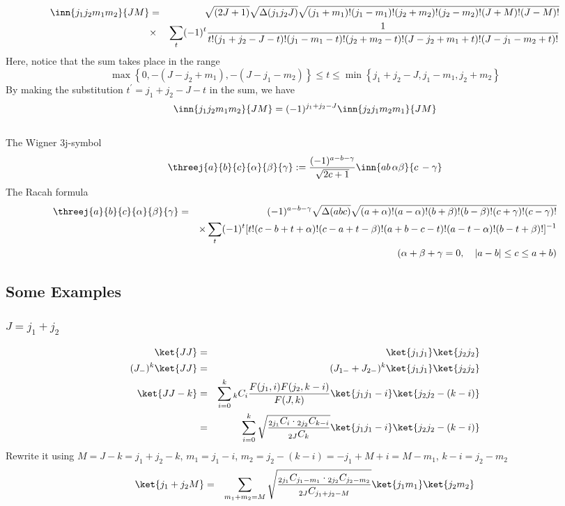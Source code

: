 \documentclass{article}
\begin{document}
{\begin{eqnarray}
\inn{j_1j_2m_1m_2}{JM} & = & \sqrt{(2J+1)}\sqrt{\Delta(j_1j_2J)}\sqrt{(j_1 + m_1)!(j_1-m_1)!(j_2+m_2 )!(j_2-m_2)!(J+M)!(J-M)!}  \nonumber\\
 & \times &  \sum_{\substack{t}} (-1)^t \frac{1}{t!(j_1 + j_2 -J - t)!(j_1 - m_1 - t)!(j_2 +m_2 -t)!(J-j_2 +m_1+t)!(J-j_1 -m_2 +t)!} \nonumber\\
\end{eqnarray}
Here, notice that the sum takes place in the range
\begin{equation}
\label{}
\max \left\{0,-(J-j_2 +m_1),-(J-j_1 -m_2)\right\} \le t \le \min \left\{j_1 + j_2 -J,j_1 - m_1,j_2 +m_2\right\}
\end{equation}
By making the substitution $t^{\prime}=j_{1}+j_{2}-J-t$ in the sum, we have
\begin{equation}
\label{}
\inn{j_1j_2m_1m_2}{JM} = (-1)^{j_{1}+j_{2}-J}\inn{j_2j_1m_2m_1}{JM}
\end{equation}
\\
The Wigner 3j-symbol
\begin{equation}
\label{ }
\threej{a}{b}{c}{\alpha}{\beta}{\gamma} := \frac{(-1)^{a-b-\gamma}}{\sqrt{2c+1}}\inn{ab\,\alpha\beta}{c\,-\gamma}
\end{equation} 
The Racah formula
\begin{eqnarray}
\threej{a}{b}{c}{\alpha}{\beta}{\gamma} & = & (-1)^{a-b-\gamma}\sqrt{\Delta(abc)}\sqrt{(a+\alpha)!(a-\alpha)!(b+\beta)!(b-\beta)!(c+\gamma)!(c-\gamma)!} \nonumber\\
 && \times \sum_t (-1)^t [t!(c-b+t+\alpha)!(c-a+t-\beta)!(a+b-c-t)!(a-t-\alpha)!(b-t+\beta)!]^{-1} \nonumber\\
 &&(\alpha + \beta + \gamma =0, \quad |a-b| \le c \le a+b) \nonumber
\end{eqnarray}

\subsection{Some Examples}
\label{sec-5-3}
\subsubsection{$J=j_1+j_2$}
\label{sec-5-3-1}
\begin{eqnarray}
\ket{JJ} & = & \ket{j_1j_1}\ket{j_2j_2} \\
(J_{-})^k\ket{JJ} & = &(J_{1-}+J_{2-})^k \ket{j_1j_1}\ket{j_2j_2} \\ 
\ket{JJ-k} & = &\sum_{i=0}^{k} {}_{k}C_{i}\frac{ F(j_1,i)F(j_2,k-i)}{F(J,k)} \ket{j_1j_1-i}\ket{j_2j_2-(k-i)} \\ 
           & = &\sum_{i=0}^{k} \sqrt{\frac{ {}_{2j_1}C_{i}\cdot {}_{2j_2}C_{k-i}}{{}_{2J}C_{k}}} \ket{j_1j_1-i}\ket{j_2j_2-(k-i)}
\end{eqnarray}
Rewrite it using $M= J-k= j_1 +j_2 -k$, $m_1 = j_1 - i$, $m_2= j_2 - (k-i) = -j_1 +M +i = M - m_1$, $k-i= j_2 -m_2$
\begin{eqnarray}
\ket{j_1+j_2M}  & = &\sum_{m_1 +m_2=M} \sqrt{\frac{ {}_{2j_1}C_{j_1 -m_1}\cdot {}_{2j_2}C_{j_2-m_2}}{{}_{2J}C_{j_1 +j_2 -M}}} \ket{j_1m_1}\ket{j_2m_2}
\end{eqnarray}

}
\end{document}
